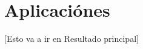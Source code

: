 \chapter{Aplicaci\'ones}\label{ch:aplicaciones}

[Esto va a ir en Resultado principal]

\section{\Dg}
